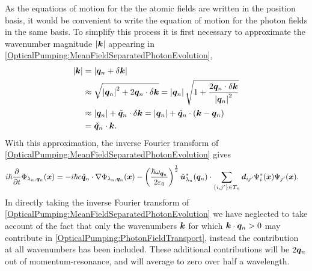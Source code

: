 As the equations of motion for the the atomic fields are written in the position basis, it would be convenient to write the equation of motion for the photon fields in the same basis.  To simplify this process it is first necessary to approximate the wavenumber magnitude $\left|\bm{k}\right|$ appearing in \eqref{OpticalPumping:MeanFieldSeparatedPhotonEvolution},
\begin{align}
    \left|\bm{k}\right| &= \left|\bm{q}_n + \delta \bm{k}\right|\notag\\
    &\approx \sqrt{\left|\bm{q}_n\right|^2 + 2 \bm{q}_n \cdot \delta \bm{k}} = \left|\bm{q}_n\right| \sqrt{1 + \frac{2 \bm{q}_n \cdot \delta \bm{k}}{\left|\bm{q}_n\right|^2}}\notag\\
    &\approx \left|\bm{q}_n\right| + \check{\bm{q}}_n \cdot \delta \bm{k} = \left|\bm{q}_n\right| + \check{\bm{q}}_n \cdot \left(\bm{k} - \bm{q}_n\right)\notag\\
    &= \check{\bm{q}}_n \cdot \bm{k}.
\end{align}
With this approximation, the inverse Fourier transform of \eqref{OpticalPumping:MeanFieldSeparatedPhotonEvolution} gives
\begin{align}
    i \hbar \frac{\partial}{\partial t} \Phi_{\lambda_n, \vect{q}_n}(\vect{x}) &= -i \hbar c \unitvec{q}_n \cdot \nabla \Phi_{\lambda_n, \vect{q}_n}(\vect{x}) - \left(\frac{\hbar \omega_{\vect{q}_n}}{2\varepsilon_0}\right)^{\frac{1}{2}} \unitvec{u}_{\lambda_n}^*(\vect{q}_n) \cdot \sum_{\{i,j'\} \in T_n} \vect{d}_{ij'} \Psi^*_i(\vect{x}) \Psi_{j'}(\vect{x}). \label{OpticalPumping:PhotonFieldTransport}
\end{align}
In directly taking the inverse Fourier transform of \eqref{OpticalPumping:MeanFieldSeparatedPhotonEvolution} we have neglected to take account of the fact that only the wavenumbers $\bm{k}$ for which $\bm{k} \cdot \bm{q}_n > 0$ may contribute in \eqref{OpticalPumping:PhotonFieldTransport}, instead the contribution at all wavenumbers has been included.  These additional contributions will be $2 \bm{q}_n$ out of momentum-resonance, and will average to zero over half a wavelength.

